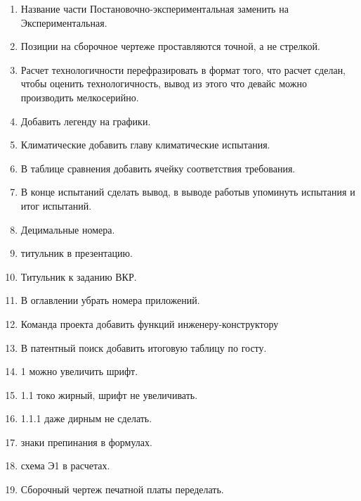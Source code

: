 \begin{enumerate}
    \item Название части \colorbox{red!50}{Постановочно-экспериментальная} заменить на \colorbox{green!50}{Экспериментальная}.
    \item Позиции на сборочное чертеже проставляются точной, а не стрелкой.
    \item Расчет технологичности перефразировать в формат того, что расчет сделан, чтобы оценить технологичность, вывод из этого что девайс можно производить мелкосерийно.
    \item Добавить легенду на графики.
    \item Климатические добавить главу климатические испытания.
    \item В таблице сравнения добавить ячейку соответствия требования.
    \item В конце испытаний сделать вывод, в выводе работыв упоминуть испытания и итог испытаний.
    \item Децимальные номера.
    \item титульник в презентацию.
    \item Титульник к заданию ВКР.
    \item В оглавлении убрать номера приложений.
    \item Команда проекта добавить функций инженеру-конструктору
    \item В патентный поиск добавить итоговую таблицу по госту.
    \item 1 можно увеличить шрифт.
    \item 1.1 токо жирный, шрифт не увеличивать.
    \item 1.1.1 даже дирным не сделать.
    \item знаки препинания в формулах.
    \item схема Э1 в расчетах.
    \item Сборочный чертеж печатной платы переделать. 
\end{enumerate}